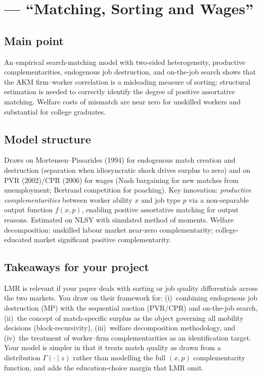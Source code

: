 \documentclass[12pt]{article}
\begin{document}
\section{\citet{lise2016} --- ``Matching, Sorting and Wages''}

\subsection*{Main point}

An empirical search-matching model with two-sided heterogeneity, productive complementarities, endogenous job destruction, and on-the-job search shows that the AKM firm--worker correlation is a misleading measure of sorting: structural estimation is needed to correctly identify the degree of positive assortative matching. Welfare costs of mismatch are near zero for unskilled workers and substantial for college graduates.

\subsection*{Model structure}

Draws on Mortensen--Pissarides (1994) for endogenous match creation and destruction (separation when idiosyncratic shock drives surplus to zero) and on PVR (2002)/CPR (2006) for wages (Nash bargaining for new matches from unemployment; Bertrand competition for poaching). Key innovation: \emph{productive complementarities} between worker ability $x$ and job type $p$ via a non-separable output function $f(x,p)$, enabling positive assortative matching for output reasons. Estimated on NLSY with simulated method of moments. Welfare decomposition: unskilled labour market near-zero complementarity; college-educated market significant positive complementarity.

\subsection*{Takeaways for your project}

LMR is relevant if your paper deals with sorting or job quality differentials across the two markets. You draw on their framework for: (i)~combining endogenous job destruction (MP) with the sequential auction (PVR/CPR) and on-the-job search, (ii)~the concept of match-specific surplus as the object governing all mobility decisions (block-recursivity), (iii)~welfare decomposition methodology, and (iv)~the treatment of worker--firm complementarities as an identification target. Your model is simpler in that it treats match quality as drawn from a distribution $\Gamma(\cdot \mid z)$ rather than modelling the full $(x,p)$ complementarity function, and adds the education-choice margin that LMR omit.
\end{document}
